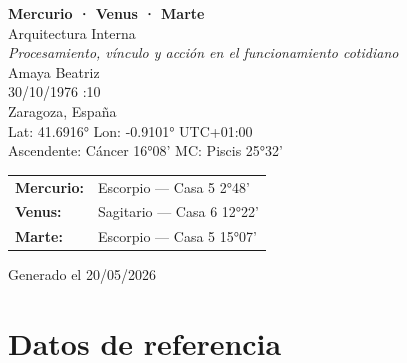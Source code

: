 \documentclass[11pt,a4paper]{article}
\begin{document}

\begin{titlepage}
  \centering

  \vspace*{2cm}

  {\Huge\bfseries\color{azulai} Mercurio · Venus · Marte}\\[0.6cm]

  {\large\color{grisai} Arquitectura Interna}\\[0.4cm]

  {\small\itshape\color{grisai}
  Procesamiento, vínculo y acción en el funcionamiento cotidiano
  }\\[2.2cm]

  {\huge\color{doradoai} Amaya Beatriz}\\[1.6cm]

  {\Large 30/10/1976 :10}\\[0.35cm]

  {\Large Zaragoza, España}\\[0.35cm]

  {\normalsize
  Lat: 41.6916° \quad
  Lon: -0.9101° \quad
  UTC+01:00
  }\\[0.35cm]

  {\normalsize
  Ascendente: Cáncer 16°08'
  \quad
  MC: Piscis 25°32'
  }\\[2.2cm]

  \renewcommand{\arraystretch}{1.35}

  \begin{tabular}{ll}
    \textbf{Mercurio:} & Escorpio — Casa 5 2°48' \\
    \textbf{Venus:}    & Sagitario — Casa 6 12°22' \\
    \textbf{Marte:}    & Escorpio — Casa 5 15°07' \\
  \end{tabular}

  \vfill

  {\small\color{grisai}
  Generado el 20/05/2026
  }

\end{titlepage}

\justifying

\tableofcontents

\clearpage

\section{Datos de referencia}
\end{document}
